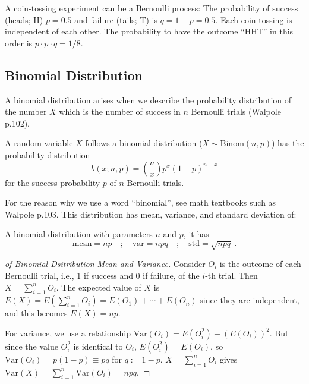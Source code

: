 A coin-tossing experiment can be a Bernoulli process: The probability of success (heads; H) $ p = 0.5 $ and failure (tails; T) is $ q = 1 - p = 0.5 $. Each coin-tossing is independent of each other. The probability to have the outcome ``HHT'' in this order is $ p \cdot p \cdot q = 1/8 $.

\subsection{Binomial Distribution}
A binomial distribution arises when we describe the probability distribution of the number $ X $ which is the number of success in $ n $ Bernoulli trials (Walpole p.102). 

\begin{defn}
A random variable $ X $ follows a binomial distribution ($ X \sim \mathrm{Binom}(n, p) $) has the probability distribution
  \begin{equation}\label{def: binom}
    b(x; n, p) = \binom{n}{x} p^x (1 - p)^{n - x}
  \end{equation}
for the success probability $ p $ of $ n $ Bernoulli trials.
\end{defn}

For the reason why we use a word ``binomial'', see math textbooks such as Walpole p.103. This distribution has mean, variance, and standard deviation of:
\begin{thm} \label{thm: binom mean var std}
A binomial distribution with parameters $ n $ and $ p $, it has
  \begin{equation}\label{eq: binom mean var std}
    \mathrm{mean} = np \quad;\quad
    \mathrm{var} = npq \quad;\quad
    \mathrm{std} = \sqrt{npq} ~.
  \end{equation}
\end{thm}
\begin{proof}[of Binomial Dsitribution Mean and Variance]
Consider $ O_i $ is the outcome of each Bernoulli trial, i.e., 1 if success and 0 if failure, of the $ i $-th trial. Then $ X = \sum_{i=1}^{n} O_i $. The expected value of $ X $ is $ E(X) = E(\sum_{i=1}^{n} O_i) = E(O_1) + \cdots + E(O_n) $ since they are independent, and this becomes $ E(X) = np $.

For variance, we use a relationship $ \mathrm{Var}(O_i) = E(O_i^2) - (E(O_i))^2 $. But since the value $ O_i^2 $ is identical to $ O_i $, $ E(O_i^2) = E(O_i) $, so $ \mathrm{Var}(O_i) = p(1-p) \equiv pq $ for $ q := 1-p $. $ X = \sum_{i=1}^{n} O_i $ gives $ \mathrm{Var}(X) = \sum_{i=1}^{n} \mathrm{Var}(O_i) = npq $.
\end{proof}


